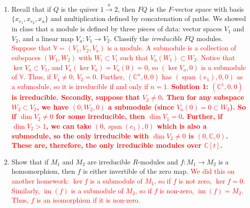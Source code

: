 \documentclass[12pt]{article}
\newcommand{\bbC}{\mathbb{C}}
\newcommand{\solution}[1]{\textcolor{red}{#1}}
\begin{document}
\begin{enumerate}
{that the original set generates $M$. }
\item Recall that if $Q$ is the quiver $1\xrightarrow{a} 2$, then $FQ$
  is the $F$-vector space with basis $\{x_{e_1},x_{e_2},x_a\}$ and
  multiplication defined by concatenation of paths. We showed in class
  that a module is defined by three pieces of data: vector spaces
  $V_1$ and $V_2$, and a linear map $V_a: V_1\rightarrow
  V_2$. Classify the \emph{irreducible} $FQ$ modules. 
\solution{
Suppose that $\mathbb{V}=(V_1, V_2, V_a)$ is a module. A submodule is a
collection of subspaces $(W_1, W_2)$ with $W_i \subset V_i$ such that
$V_a(W_1) \subset W_2$. Notice that $\ker V_a\subset V_1$, and
$V_a(\ker V_a)=V_a(0)=0$, so $(\ker V_a, 0)$ is a submodule of
$\mathbb{V}$. Thus, if $V_1\neq 0$, $V_2=0$. Further, $(\bbC^n, 0, 0)$
has $(\operatorname{span}(e_1),0,0)$ as a submodule, so it is
irreducible if and only if $n=1$. \bf{Solution 1: $(\bbC^1, 0, 0)$ is
  irreducible.} Secondly, suppose that $V_2\neq 0$. Then for any
subspace $W_2 \subset V_2$, we have $(0, W_2, 0)$ a submodule (since
$V_a(0)=0\subset W_2$). So if $\dim V_2\neq 0$ for some irreducible,
then $\dim V_1=0$. Further, if $\dim V_2>1$, we can take $(0,
\operatorname{span}(e_1), 0)$ which is also a submodule, so the only
irreducible with $\dim V_2\neq 0$ is $(0, \bbC, 0)$. These are,
therefore, the only irreducible modules over $\bbC[t]$. 
}
\item Show that if $M_1$ and $M_2$ are irreducible $R$-modules and $f:
  M_1\rightarrow M_2$ is a homomorphism, then $f$ is either invertible
  of the zero map. 
\solution{We did this on another homework: $\ker f$ is a submodule of $M_1$, so
if $f$ is not zero, $\ker f=0$. Similarly, $\operatorname{im}(f)$ is a
submodule of $M_2$, so if $f$ is non-zero, $\operatorname{im}(f) =
M_2$. Thus, $f$ is an isomorphism if it is non-zero. }
\end{enumerate}
\end{document}

